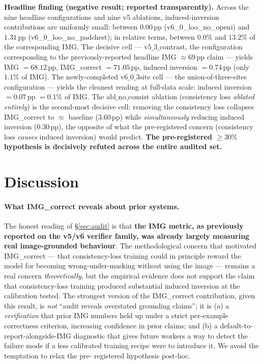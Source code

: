 \documentclass{article}
\begin{document}
\textbf{Headline finding (negative result; reported transparently).} Across
the nine headline configurations and nine v5 ablations, induced-inversion
contributions are uniformly small: between $0.00$\,pp (v6\_0\_loo\_no\_openi)
and $1.31$\,pp (v6\_0\_loo\_no\_padchest); in relative terms, between
$0.0\%$ and $13.2\%$ of the corresponding IMG. The decisive cell ---
$\mathrm{v5\_3\_contrast}$, the configuration corresponding to the
previously-reported headline IMG $\approx 69$\,pp claim --- yields IMG
$= 68.12$\,pp, IMG\_correct $= 71.05$\,pp, induced inversion $= 0.74$\,pp
(only $1.1\%$ of IMG). The newly-completed $\mathrm{v6\_0\_3site}$ cell ---
the union-of-three-sites configuration --- yields the cleanest reading at
full-data scale: induced inversion $= 0.07$\,pp $= 0.1\%$ of IMG. The
$\mathrm{abl\_no\_consist}$ ablation (consistency loss \emph{ablated
entirely}) is the second-most decisive cell: removing the consistency loss
collapses IMG\_correct to $\approx$ baseline (3.60\,pp) while
\emph{simultaneously} reducing induced inversion (0.30\,pp), the opposite
of what the pre-registered concern (consistency loss \emph{causes} induced
inversion) would predict. \textbf{The pre-registered $\geq 30\%$ hypothesis
is decisively refuted across the entire audited set.}

\section{Discussion}
\label{sec:discuss}

\paragraph{What IMG\_correct reveals about prior systems.} The honest
reading of \S\ref{sec:audit} is that \textbf{the IMG metric, as previously
reported on the v5/v6 verifier family, was already largely measuring real
image-grounded behaviour}. The methodological concern that motivated
IMG\_correct --- that consistency-loss training could in principle reward
the model for becoming wrong-under-masking without using the image ---
remains a real concern \emph{theoretically}, but the empirical evidence
does not support the claim that consistency-loss training produced
substantial induced inversion at the calibration tested. The strongest
version of the IMG\_correct contribution, given this result, is
\emph{not} ``audit reveals overstated grounding claims''; it is (a) a
\emph{verification} that prior IMG numbers held up under a strict
per-example correctness criterion, increasing confidence in prior claims;
and (b) a default-to-report-alongside-IMG diagnostic that gives future
workers a way to detect the failure mode if a less calibrated training
recipe were to introduce it. We avoid the temptation to relax the pre-
registered hypothesis post-hoc.
\end{document}
